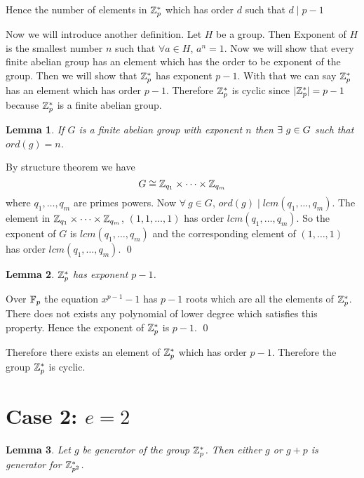 \documentclass[a4paper, 11pt]{article}
\newtheorem{lemma}{Lemma}
\renewenvironment{proof}{\noindent{\it \textbf{Proof:}}\hspace*{1em}}{\qed\bigskip\\}
\begin{document}
{	Hence the number of elements in $\mathbb{Z}_p^*$ which has order $d$ such that $d\mid p-1$
	
	Now we will introduce another definition. Let $H$ be a group. Then Exponent of $H$ is the smallest number $n$ such that $\forall a\in H$, $a^n=1$. Now we will show that every finite abelian group has an element which has the order to be exponent of the group. Then we will show that $\mathbb{Z}_p^*$ has exponent $p-1$. With that we can say $\mathbb{Z}_p^*$ has an element which has order $p-1$. Therefore $\mathbb{Z}_p^*$ is cyclic since $|\mathbb{Z}_p^*|=p-1$ because $\mathbb{Z}_p^*$ is a finite abelian group.
	\begin{lemma}
		If $G$ is a finite abelian group with exponent $n$ then $\exists\ g\in G$ such that $ord(g)=n$.
	\end{lemma}
	\begin{proof}
		By structure theorem we have $$G\cong \mathbb{Z}_{q_1}\times \cdots \times \mathbb{Z}_{q_m}$$ where $q_1,\dots, q_m$ are primes powers. Now $\forall\ g\in G$, $ord(g)\mid lcm(q_1,\dots,q_m)$. The element in $\mathbb{Z}_{q_1}\times \cdots \times \mathbb{Z}_{q_m}$, $(1,1,\dots, 1)$ has order $lcm(q_1,\dots,q_m)$. So the exponent of $G$ is $lcm(q_1,\dots,q_m)$ and the corresponding element of $(1,\dots,1)$ has order $lcm(q_1,\dots,q_m)$.
	\end{proof}
	\begin{lemma}
		$\mathbb{Z}_p^*$ has exponent $p-1$.
	\end{lemma}
	\begin{proof}
		Over $\mathbb{F}_p$ the equation $x^{p-1}-1$ has $p-1$ roots which are all the elements of $\mathbb{Z}_p^*$. There does not exists any polynomial of lower degree which satisfies this property. Hence the exponent of $\mathbb{Z}_p^*$ is $p-1$.
	\end{proof}
	
	Therefore there exists an element of $\mathbb{Z}_p^*$ which has order $p-1$. Therefore the group $\mathbb{Z}_p^*$ is cyclic.
	\section*{Case 2: $e=2$}
	\begin{lemma}
		Let $g$ be generator of the group $\mathbb{Z}_p^*$. Then either $g$ or $g+p$ is generator for $\mathbb{Z}_{p^2}^*$.
	\end{lemma}
	
}
\end{document}
